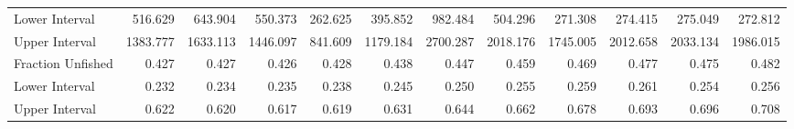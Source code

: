 \documentclass[
  english,
  a4paper,
]{article}
\begin{document}
\begin{table}[H]
{\begin{tabular}[t]{lrrrrrrrrrrr}
\hspace{1em}Lower Interval & 516.629 & 643.904 & 550.373 & 262.625 & 395.852 & 982.484 & 504.296 & 271.308 & 274.415 & 275.049 & 272.812\\
\hspace{1em}Upper Interval & 1383.777 & 1633.113 & 1446.097 & 841.609 & 1179.184 & 2700.287 & 2018.176 & 1745.005 & 2012.658 & 2033.134 & 1986.015\\
Fraction Unfished & 0.427 & 0.427 & 0.426 & 0.428 & 0.438 & 0.447 & 0.459 & 0.469 & 0.477 & 0.475 & 0.482\\
Lower Interval & 0.232 & 0.234 & 0.235 & 0.238 & 0.245 & 0.250 & 0.255 & 0.259 & 0.261 & 0.254 & 0.256\\
Upper Interval & 0.622 & 0.620 & 0.617 & 0.619 & 0.631 & 0.644 & 0.662 & 0.678 & 0.693 & 0.696 & 0.708\\
\bottomrule
\end{tabular}}
\end{table}
\end{document}
